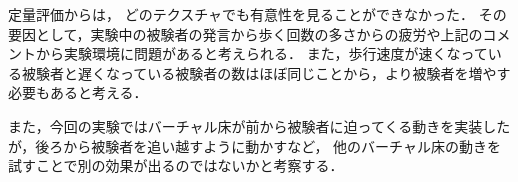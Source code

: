 定量評価からは，
どのテクスチャでも有意性を見ることができなかった．
その要因として，実験中の被験者の発言から歩く回数の多さからの疲労や上記のコメントから実験環境に問題があると考えられる．
また，歩行速度が速くなっている被験者と遅くなっている被験者の数はほぼ同じことから，より被験者を増やす必要もあると考える．

また，今回の実験ではバーチャル床が前から被験者に迫ってくる動きを実装したが，後ろから被験者を追い越すように動かすなど，
他のバーチャル床の動きを試すことで別の効果が出るのではないかと考察する．
